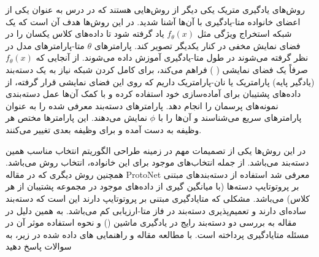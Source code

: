 \documentclass{article}
\begin{document}
روش‌های یادگیری متریک یکی دیگر از روش‌هایی هستند که در درس به عنوان یکی از اعضای خانواده متا-یادگیری با آن‌ها آشنا شدید. در این روش‌ها هدف آن است که یک شبکه استخراج ویژگی مثل
$f_\theta(x)$
یاد گرفته شود تا داده‌های کلاس یکسان را در فضای نمایش مخفی در کنار یکدیگر تصویر کند. پارامترهای 
$\theta$
متا-پارامترهای مدل در نظر گرفته می‌شوند در طول متا-یادگیری آموزش داده می‌شوند. از آنجایی که 
$f_\theta(x)$
صرفاً یک فضای نمایشی (
) فراهم می‌کند، برای کامل کردن شبکه نیاز به یک دسته‌بند (یادگیر پایه) پارامتریک یا نان-پارامتریک داریم که روی این فضای نمایشی قرار گرفته، از داده‌های پشتیبان برای آماده‌سازی خود استفاده کرده و با کمک آن‌ها عمل دسته‌بندی نمونه‌های پرسمان را انجام دهد. پارامترهای دسته‌بند معرفی شده را به عنوان پارامترهای سریع می‌شناسند و آن‌ها را با 
$\phi$
نمایش می‌دهند. این پارامترها مختص هر وظیفه به دست آمده و برای وظیفه بعدی تغییر می‌کنند.

در این روش‌ها یکی از تصمیمات مهم در زمینه طراحی الگوریتم انتخاب مناسب همین دسته‌بند می‌باشد. از جمله انتخاب‌های موجود برای این خانواده، انتخاب روش  
می‌باشد. همچنین روش دیگری که در مقاله ProtoNet معرفی شد استفاده از دسته‌بندهای مبتنی بر پروتوتایپ دسته‌ها (با میانگین گیری از داده‌های موجود در مجموعه پشتیبان از هر کلاس) می‌باشد. 
مشکلی که متایادگیری مبتنی بر پروتوتایپ دارند این است که دسته‌بند ساده‌ای دارند و تعمیم‌پذیری دسته‌بند در فاز متا-ارزیابی کم می‌باشد. به همین دلیل در مقاله
به بررسی دو دسته‌بند رایج در یادگیری ماشین () و نحوه استفاده موثر آن در مسئله متایادگیری پرداخته است. با مطالعه مقاله و راهنمایی های داده‌ شده در زیر،‌ به سوالات پاسخ دهید
\end{document}
